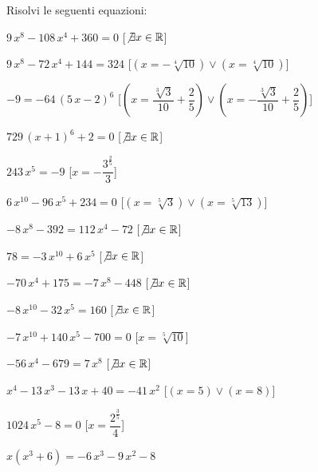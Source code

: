 \begin{esercizio}\label{ese:03.1}
Risolvi le seguenti equazioni:
\begin{enumeratea}
\item \(9\,{x}^{8}-108\,{x}^{4}+360=0\) 
\hfill [\(\not\exists x \in \mathbb{R}\)]
\item \(9\,{x}^{8}-72\,{x}^{4}+144=324\) 
\hfill [\((x=-\sqrt [4]{10})\vee (x=\sqrt [4]{10})\)]
\item \(-9=-64\, \left( 5\,x-2 \right) ^{6}\) 
\hfill [\((x={\dfrac{\sqrt [3]{3}}{10}}+{\dfrac{2}{5}})\vee (x=-{\dfrac
{\sqrt 
[3]{3}}{10}}+{\dfrac{2}{5}})\)]
\item \(729\, \left( x+1 \right) ^{6}+2=0\) 
\hfill [\(\not\exists x \in \mathbb{R}\)]
\item \(243\,{x}^{5}=-9\) 
\hfill [\(x=-{\dfrac{{3}^{{\frac{2}{5}}}}{3}}\)]
\item \(6\,{x}^{10}-96\,{x}^{5}+234=0\) 
\hfill [\((x=\sqrt [5]{3})\vee (x=\sqrt [5]{13})\)]
\item \(-8\,{x}^{8}-392=112\,{x}^{4}-72\) 
\hfill [\(\not\exists x \in \mathbb{R}\)]
\item \(78=-3\,{x}^{10}+6\,{x}^{5}\) 
\hfill [\(\not\exists x \in \mathbb{R}\)]
\item \(-70\,{x}^{4}+175=-7\,{x}^{8}-448\) 
\hfill [\(\not\exists x \in \mathbb{R}\)]
\item \(-8\,{x}^{10}-32\,{x}^{5}=160\) 
\hfill [\(\not\exists x \in \mathbb{R}\)]
\item \(-7\,{x}^{10}+140\,{x}^{5}-700=0\) 
\hfill [\(x=\sqrt [5]{10}\)]
\item \(-56\,{x}^{4}-679=7\,{x}^{8}\) 
\hfill [\(\not\exists x \in \mathbb{R}\)]
\item \({x}^{4}-13\,{x}^{3}-13\,x+40=-41\,{x}^{2}\) 
\hfill [\((x=5)\vee (x=8)\)]
\item \(1024\,{x}^{5}-8=0\) 
\hfill [\(x={\dfrac{{2}^{{\frac{3}{5}}}}{4}}\)]
\item \(x \left( {x}^{3}+6 \right) =-6\,{x}^{3}-9\,{x}^{2}-8\) 

\end{enumeratea}
\end{esercizio}

